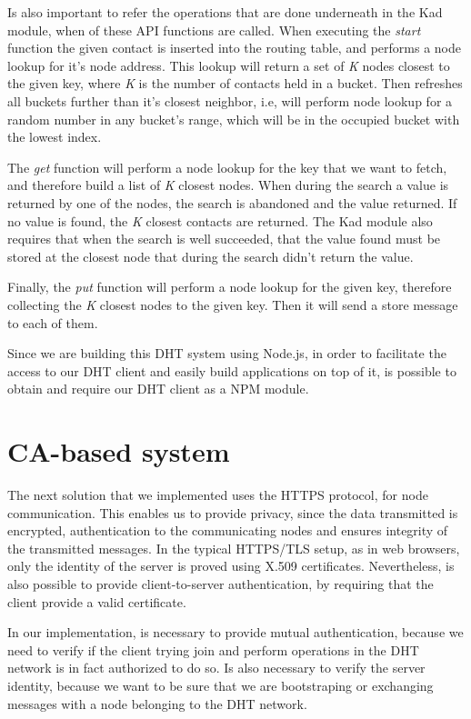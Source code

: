 Is also important to refer the operations that are done underneath in the Kad module, when of these API functions are called.
When executing the \textit{start} function the given contact is inserted into the routing table, and performs a node lookup for it's node address.
This lookup will return a set of \textit{K} nodes closest to the given key, where \textit{K} is the number of contacts held in a bucket.
Then refreshes all buckets further than it's closest neighbor, i.e, will perform node lookup for a random number in any bucket's range, which will be in the occupied bucket with the lowest index.

The \textit{get} function will perform a node lookup for the key that we want to fetch, and therefore build a list of \textit{K} closest nodes.
When during the search a value is returned by one of the nodes, the search is abandoned and the value returned.
If no value is found,  the \textit{K} closest contacts are returned.
The Kad module also requires that when the search is well succeeded, that the value found must be stored at the closest node that during the search didn't return the value.

Finally, the \textit{put} function will perform a node lookup for the given key, therefore collecting the \textit{K} closest nodes to the given key.
Then it will send a store message to each of them.

Since we are building this DHT system using Node.js, in order to facilitate the access to our DHT client and easily build applications on top of it, is possible to obtain and require our DHT client as a \ac{NPM} module.

\section{CA-based system}\label{implementation:ca-based}

The next solution that we implemented uses the HTTPS protocol, for node communication.
This enables us to provide privacy, since the data transmitted is encrypted, authentication to the communicating nodes and ensures integrity of the transmitted messages.
In the typical HTTPS/TLS setup, as in web browsers, only the identity of the server is proved using X.509 certificates.
Nevertheless, is also possible to provide client-to-server authentication, by requiring that the client provide a valid certificate.

In our implementation, is necessary to provide mutual authentication, because we need to verify if the client trying join and perform operations in the DHT network is in fact authorized to do so.
Is also necessary to verify the server identity, because we want to be sure that we are bootstraping or exchanging messages with a node belonging to the DHT network.


